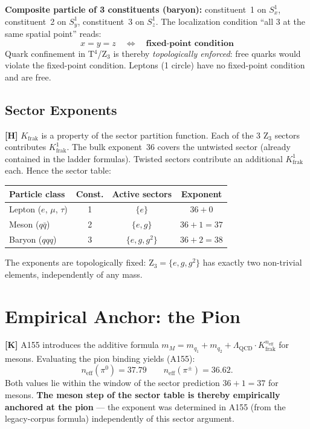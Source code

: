 \textbf{Composite particle of 3 constituents (baryon):}
constituent~1 on $S^1_x$, constituent~2 on $S^1_y$, constituent~3 on
$S^1_z$. The localization condition ``all 3 at the same spatial
point'' reads:
\[
  x = y = z \quad \Leftrightarrow \quad \textbf{fixed-point condition}
\]
Quark confinement in T$^4$/Z$_3$ is thereby \emph{topologically
enforced}: free quarks would violate the fixed-point condition.
Leptons (1 circle) have no fixed-point condition and are free.

\subsection{Sector Exponents}

\textbf{[H]} $K_\text{frak}$ is a property of the sector partition
function. Each of the 3 Z$_3$ sectors contributes $K_\text{frak}^1$.
The bulk exponent~36 covers the untwisted sector (already contained in
the ladder formulas). Twisted sectors contribute an additional
$K_\text{frak}^1$ each. Hence the sector table:

\begin{center}
\renewcommand{\arraystretch}{1.3}
{\small\begin{tabular}{lccc}
\toprule
Particle class & Const. & Active sectors & Exponent \\
\midrule
Lepton ($e$, $\mu$, $\tau$) & 1 & $\{e\}$ & $36+0$ \\
Meson ($q\bar{q}$) & 2 & $\{e, g\}$ & $36+1 = 37$ \\
Baryon ($qqq$) & 3 & $\{e, g, g^2\}$ & $36+2 = 38$ \\
\bottomrule
\end{tabular}}
\renewcommand{\arraystretch}{1.0}
\end{center}

The exponents are topologically fixed: Z$_3 = \{e,g,g^2\}$ has exactly
two non-trivial elements, independently of any mass.

\section{Empirical Anchor: the Pion}

\textbf{[K]} A155 introduces the additive formula
$m_M = m_{q_1} + m_{q_2} + \Lambda_\text{QCD}\cdot
K_\text{frak}^{n_\text{eff}}$ for mesons. Evaluating the pion binding
yields (A155):
\[
  \boxed{n_\text{eff}(\pi^0) = 37{.}79}
  \qquad n_\text{eff}(\pi^\pm) = 36{.}62.
\]
Both values lie within the window of the sector prediction $36+1 = 37$
for mesons. \textbf{The meson step of the sector table is thereby
empirically anchored at the pion} --- the exponent was determined in
A155 (from the legacy-corpus formula) independently of this sector
argument.

